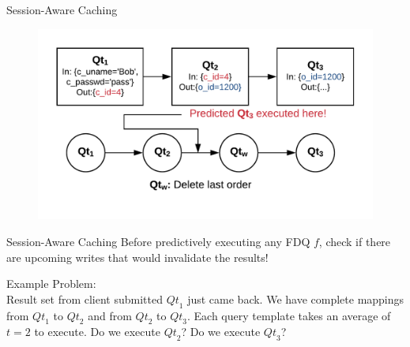 \documentclass[10pt]{beamer}
\begin{document}
\begin{frame}[fragile]{Session-Aware Caching}
    \begin{figure}
        \center
        \includegraphics[scale=0.22]{apollo_write_boundary_2}
    \end{figure}
\end{frame}

\begin{frame}[fragile]{Session-Aware Caching}
    Before predictively executing any FDQ $f$, check if there are upcoming writes that would
    invalidate the results!
    \begin{itemize}
    \end{itemize}
\end{frame}

\begin{frame}[fragile]{Example}
    \alert{Problem:}\\
    Result set from client submitted $\mathit{Qt}_1$ just came back. We have complete mappings from $\mathit{Qt}_1$ to
    $\mathit{Qt}_2$ and from $\mathit{Qt}_2$ to $\mathit{Qt}_3$. Each query template takes an average of $t=2$ to execute. Do we execute $\mathit{Qt}_2$?
    Do we execute $\mathit{Qt}_3$?
\end{frame}
\end{document}
